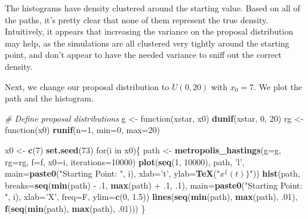\documentclass[]{article}
\newenvironment{Shaded}{\begin{snugshade}}{\end{snugshade}}
\newcommand{\KeywordTok}[1]{\textcolor[rgb]{0.13,0.29,0.53}{\textbf{{#1}}}}
\newcommand{\DataTypeTok}[1]{\textcolor[rgb]{0.13,0.29,0.53}{{#1}}}
\newcommand{\DecValTok}[1]{\textcolor[rgb]{0.00,0.00,0.81}{{#1}}}
\newcommand{\FloatTok}[1]{\textcolor[rgb]{0.00,0.00,0.81}{{#1}}}
\newcommand{\StringTok}[1]{\textcolor[rgb]{0.31,0.60,0.02}{{#1}}}
\newcommand{\CommentTok}[1]{\textcolor[rgb]{0.56,0.35,0.01}{\textit{{#1}}}}
\newcommand{\NormalTok}[1]{{#1}}
\begin{document}
The histograms have density clustered around the starting value. Based
on all of the paths, it's pretty clear that none of them represent the
true density. Intuitively, it appears that increasing the variance on
the proposal distribution may help, as the simulations are all clustered
very tightly around the starting point, and don't appear to have the
needed variance to sniff out the correct density.

Next, we change our proposal distribution to \(U(0, 20)\) with
\(x_0=7\). We plot the path and the histogram.

\begin{Shaded}
\begin{Highlighting}[]
\CommentTok{# Define proposal distributions}
\NormalTok{g <-}\StringTok{ }\NormalTok{function(xstar, x0) }\KeywordTok{dunif}\NormalTok{(xstar, }\DecValTok{0}\NormalTok{, }\DecValTok{20}\NormalTok{)}
\NormalTok{rg <-}\StringTok{ }\NormalTok{function(x0) }\KeywordTok{runif}\NormalTok{(}\DataTypeTok{n=}\DecValTok{1}\NormalTok{, }\DataTypeTok{min=}\DecValTok{0}\NormalTok{, }\DataTypeTok{max=}\DecValTok{20}\NormalTok{)}

\NormalTok{x0 <-}\StringTok{ }\KeywordTok{c}\NormalTok{(}\DecValTok{7}\NormalTok{)}
\KeywordTok{set.seed}\NormalTok{(}\DecValTok{73}\NormalTok{)}
\NormalTok{for(i in x0)\{}
  \NormalTok{path <-}\StringTok{ }\KeywordTok{metropolis_hastings}\NormalTok{(}\DataTypeTok{g=}\NormalTok{g, }\DataTypeTok{rg=}\NormalTok{rg, }\DataTypeTok{f=}\NormalTok{f, }\DataTypeTok{x0=}\NormalTok{i, }\DataTypeTok{iterations=}\DecValTok{10000}\NormalTok{)}
  \KeywordTok{plot}\NormalTok{(}\KeywordTok{seq}\NormalTok{(}\DecValTok{1}\NormalTok{, }\DecValTok{10000}\NormalTok{), path, }\StringTok{'l'}\NormalTok{, }\DataTypeTok{main=}\KeywordTok{paste0}\NormalTok{(}\StringTok{"Starting Point: "}\NormalTok{, i), }\DataTypeTok{xlab=}\StringTok{'t'}\NormalTok{, }\DataTypeTok{ylab=}\KeywordTok{TeX}\NormalTok{(}\StringTok{"$x^\{(t)\}$"}\NormalTok{))}
  \KeywordTok{hist}\NormalTok{(path, }\DataTypeTok{breaks=}\KeywordTok{seq}\NormalTok{(}\KeywordTok{min}\NormalTok{(path) -}\StringTok{ }\NormalTok{.}\DecValTok{1}\NormalTok{, }\KeywordTok{max}\NormalTok{(path) +}\StringTok{ }\NormalTok{.}\DecValTok{1}\NormalTok{, .}\DecValTok{1}\NormalTok{), }\DataTypeTok{main=}\KeywordTok{paste0}\NormalTok{(}\StringTok{"Starting Point: "}\NormalTok{, i), }\DataTypeTok{xlab=}\StringTok{'X'}\NormalTok{, }\DataTypeTok{freq=}\NormalTok{F, }\DataTypeTok{ylim=}\KeywordTok{c}\NormalTok{(}\DecValTok{0}\NormalTok{, }\FloatTok{1.5}\NormalTok{))}
  \KeywordTok{lines}\NormalTok{(}\KeywordTok{seq}\NormalTok{(}\KeywordTok{min}\NormalTok{(path), }\KeywordTok{max}\NormalTok{(path), .}\DecValTok{01}\NormalTok{), }\KeywordTok{f}\NormalTok{(}\KeywordTok{seq}\NormalTok{(}\KeywordTok{min}\NormalTok{(path), }\KeywordTok{max}\NormalTok{(path), .}\DecValTok{01}\NormalTok{)))}
\NormalTok{\}}
\end{Highlighting}
\end{Shaded}
\end{document}
